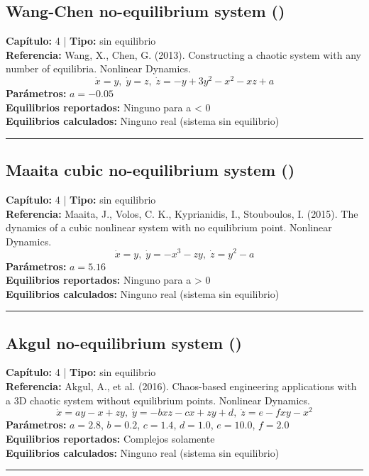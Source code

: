 \subsection*{Wang-Chen no-equilibrium system ()}
\textbf{Capítulo:} 4 | \textbf{Tipo:} sin equilibrio\\
\textbf{Referencia:} Wang, X., Chen, G. (2013). Constructing a chaotic system with any number of equilibria. Nonlinear Dynamics.\\
\[\dot{x}=y, \; \dot{y}=z, \; \dot{z}=-y+3y^2-x^2-xz+a\]
\textbf{Parámetros:} $a = -0.05$\\
\textbf{Equilibrios reportados:} Ninguno para a < 0\\
\textbf{Equilibrios calculados:} Ninguno real (sistema sin equilibrio)\\
\hrule

\subsection*{Maaita cubic no-equilibrium system ()}
\textbf{Capítulo:} 4 | \textbf{Tipo:} sin equilibrio\\
\textbf{Referencia:} Maaita, J., Volos, C. K., Kyprianidis, I., Stouboulos, I. (2015). The dynamics of a cubic nonlinear system with no equilibrium point. Nonlinear Dynamics.\\
\[\dot{x}=y, \; \dot{y}=-x^3-zy, \; \dot{z}=y^2-a\]
\textbf{Parámetros:} $a = 5.16$\\
\textbf{Equilibrios reportados:} Ninguno para a > 0\\
\textbf{Equilibrios calculados:} Ninguno real (sistema sin equilibrio)\\
\hrule

\subsection*{Akgul no-equilibrium system ()}
\textbf{Capítulo:} 4 | \textbf{Tipo:} sin equilibrio\\
\textbf{Referencia:} Akgul, A., et al. (2016). Chaos-based engineering applications with a 3D chaotic system without equilibrium points. Nonlinear Dynamics.\\
\[\dot{x}=ay-x+zy, \; \dot{y}=-bxz-cx+zy+d, \; \dot{z}=e-fxy-x^2\]
\textbf{Parámetros:} $a = 2.8$, $b = 0.2$, $c = 1.4$, $d = 1.0$, $e = 10.0$, $f = 2.0$\\
\textbf{Equilibrios reportados:} Complejos solamente\\
\textbf{Equilibrios calculados:} Ninguno real (sistema sin equilibrio)\\
\hrule

